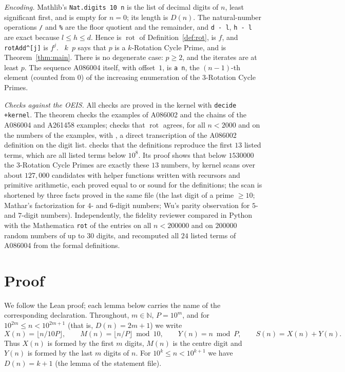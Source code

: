 \documentclass[11pt]{amsart}
\theoremstyle{plain}
\theoremstyle{definition}
\newcommand{\N}{\mathbb{N}}
\DeclareMathOperator{\rot}{rot}
\newcommand{\nd}{D}
\begin{document}
\emph{Encoding.} Mathlib's \texttt{Nat.digits 10 n} is the list of decimal digits of $n$, least significant first, and is empty for $n=0$; its length is $\nd(n)$. The natural-number operations \texttt{/} and \texttt{\%} are the floor quotient and the remainder, and \texttt{d - l}, \texttt{h - l} are exact because $l\le h\le d$. Hence  is $\rot$ of Definition~\ref{def:rot},  is $f$, and \texttt{rotAdd\^{}[j]} is $f^j$. ~$k$~$p$ says that $p$ is a $k$-Rotation Cycle Prime, and  is Theorem~\ref{thm:main}. There is no degenerate case: $p\ge2$, and the iterates are at least $p$. The sequence A086004 itself, with offset~$1$, is \texttt{a n}, the $(n-1)$-th element (counted from $0$) of the increasing enumeration of the 3-Rotation Cycle Primes.

\emph{Checks against the OEIS.} All checks are proved in the kernel with \texttt{decide +kernel}. The theorem  checks the examples of A086002 and the chains of the A086004 and A261458 examples;  checks that $\rot$ agrees, for all $n<2000$ and on the numbers of the examples, with , a direct transcription of the A086002 definition on the digit list.  checks that the definitions reproduce the first $13$ listed terms, which are all listed terms below $10^8$. Its proof shows that below $1530000$ the 3-Rotation Cycle Primes are exactly these $13$ numbers, by kernel scans over about $127{,}000$ candidates with helper functions written with recursors and primitive arithmetic, each proved equal to or sound for the definitions; the scan is shortened by three facts proved in the same file (the last digit of a prime $\ge10$; Mathar's factorization for $4$- and $6$-digit numbers; Wu's parity observation for $5$- and $7$-digit numbers). Independently, the fidelity reviewer compared  in Python with the Mathematica \texttt{rot} of the entries on all $n<200000$ and on $200000$ random numbers of up to $30$ digits, and recomputed all $24$ listed terms of A086004 from the formal definitions.

\section{Proof}\label{sec:proof}

We follow the Lean proof; each lemma below carries the name of the corresponding declaration. Throughout, $m\in\N$, $P=10^m$, and for $10^{2m}\le n<10^{2m+1}$ (that is, $\nd(n)=2m+1$) we write
\[
  X(n)=\lfloor n/10P\rfloor,\qquad M(n)=\lfloor n/P\rfloor\bmod10,\qquad Y(n)=n\bmod P,\qquad S(n)=X(n)+Y(n).
\]
Thus $X(n)$ is formed by the first $m$ digits, $M(n)$ is the centre digit and $Y(n)$ is formed by the last $m$ digits of $n$. For $10^k\le n<10^{k+1}$ we have $\nd(n)=k+1$ (the lemma  of the statement file).
\end{document}
